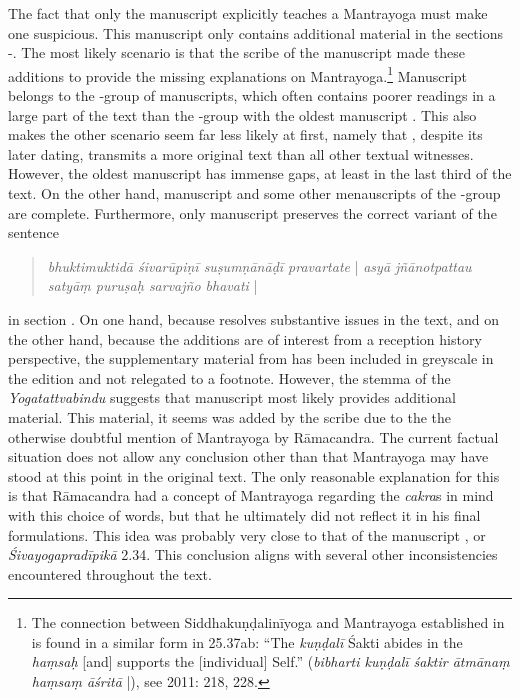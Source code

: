The fact that only the manuscript  explicitly teaches a Mantrayoga must make one suspicious. This manuscript only contains additional material in the sections -. The most likely scenario is that the scribe of the manuscript  made these additions to provide the missing explanations on Mantrayoga.\footnote{The connection between Siddhakuṇḍalinīyoga and Mantrayoga established in  is found in a similar form in  25.37ab: ``The \textit{kuṇḍalī} Śakti abides in the \textit{haṃsaḥ} [and] supports the [individual] Self.'' (\textit{bibharti kuṇḍalī śaktir ātmānaṃ haṃsaṃ āśritā} |), see \citeauthor{saradatilakafull} 2011: 218, 228.} Manuscript  belongs to the \beta-group of manuscripts, which often contains poorer readings in a large part of the text than the \alpha-group with the oldest manuscript . This also makes the other scenario seem far less likely at first, namely that , despite its later dating, transmits a more original text than all other textual witnesses. However, the oldest manuscript  has immense gaps, at least in the last third of the text. On the other hand, manuscript  and some other menauscripts of the \beta-group are complete. Furthermore, only manuscript  preserves the correct variant of the sentence \begin{quote} \textit{bhuktimuktidā śivarūpiṇī suṣumṇānāḍī pravartate} | \textit{asyā jñānotpattau satyāṃ puruṣaḥ sarvajño bhavati} | \end{quote} in section . On one hand, because  resolves substantive issues in the text, and on the other hand, because the additions are of interest from a reception history perspective, the supplementary material from  has been included in greyscale in the edition and not relegated to a footnote. However, the stemma of the \textit{Yogatattvabindu} suggests that manuscript  most likely provides additional material. This material, it seems was added by the scribe due to the the otherwise doubtful mention of Mantrayoga by Rāmacandra. The current factual situation does not allow any conclusion other than that Mantrayoga may have stood at this point in the original text. The only reasonable explanation for this is that Rāmacandra had a concept of Mantrayoga regarding the \textit{cakra}s in mind with this choice of words, but that he ultimately did not reflect it in his final formulations. This idea was probably very close to that of the manuscript , or \emph{Śivayogapradīpikā} 2.34. This conclusion aligns with several other inconsistencies encountered throughout the text.  

